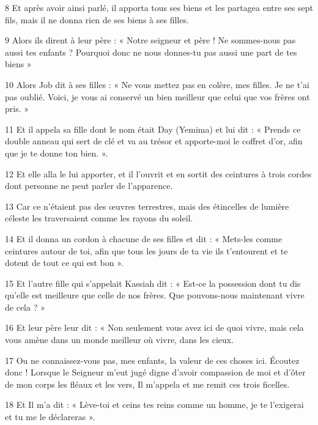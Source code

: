 \par 8 Et après avoir ainsi parlé, il apporta tous ses biens et les partagea entre ses sept fils, mais il ne donna rien de ses biens à ses filles.

\par 9 Alors ils dirent à leur père : « Notre seigneur et père ! Ne sommes-nous pas aussi tes enfants ? Pourquoi donc ne nous donnes-tu pas aussi une part de tes biens »

\par 10 Alors Job dit à ses filles : « Ne vous mettez pas en colère, mes filles. Je ne t'ai pas oublié. Voici, je vous ai conservé un bien meilleur que celui que vos frères ont pris. »

\par 11 Et il appela sa fille dont le nom était Day (Yemima) et lui dit : « Prends ce double anneau qui sert de clé et va au trésor et apporte-moi le coffret d'or, afin que je te donne ton bien. ».

\par 12 Et elle alla le lui apporter, et il l'ouvrit et en sortit des ceintures à trois cordes dont personne ne peut parler de l'apparence.

\par 13 Car ce n'étaient pas des œuvres terrestres, mais des étincelles de lumière céleste les traversaient comme les rayons du soleil.

\par 14 Et il donna un cordon à chacune de ses filles et dit : « Mets-les comme ceintures autour de toi, afin que tous les jours de ta vie ils t'entourent et te dotent de tout ce qui est bon ».

\par 15 Et l'autre fille qui s'appelait Kassiah dit : « Est-ce la possession dont tu dis qu'elle est meilleure que celle de nos frères. Que pouvons-nous maintenant vivre de cela ? »

\par 16 Et leur père leur dit : « Non seulement vous avez ici de quoi vivre, mais cela vous amène dans un monde meilleur où vivre, dans les cieux.

\par 17 Ou ne connaissez-vous pas, mes enfants, la valeur de ces choses ici. Écoutez donc ! Lorsque le Seigneur m'eut jugé digne d'avoir compassion de moi et d'ôter de mon corps les fléaux et les vers, Il m'appela et me remit ces trois ficelles.

\par 18 Et Il m'a dit : « Lève-toi et ceins tes reins comme un homme, je te l'exigerai et tu me le déclareras ».

